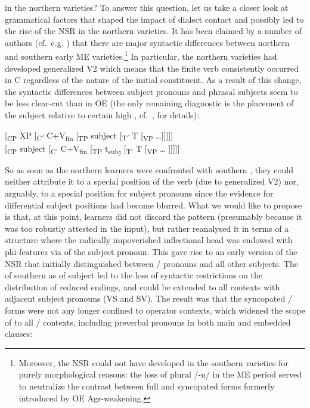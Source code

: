 \documentclass[output=paper]{langsci/langscibook}
\begin{document}
in the northern varieties? To answer this question, let us take a closer look
at grammatical factors that shaped the impact of dialect contact and possibly
led to the rise of the \gls{NSR} in the northern
varieties. It has been claimed by a number of authors (cf.\ e.g.
\citealt{Krochtaylor:1997,Trips:2002}) that there are major syntactic
differences between northern and southern early ME
varieties.\footnote{Moreover, the \gls{NSR} could not
    have developed in the southern varieties for purely morphological reasons:
    the loss of plural /-n/ in the \gls{ME} period served to
    neutralize the contrast between full and syncopated forms formerly
    introduced by \gls{OE} Agr-weakening.} In particular, the northern
    varieties had developed generalized V2 which means that the finite verb
    consistently occurred in C regardless of the nature of the initial
    constituent.  As a result of this change, the syntactic differences between
    subject pronouns and phrasal subjects seem to be less clear-cut than in
    \gls{OE} (the only remaining diagnostic is the placement of the subject
    relative to certain high , cf.\ \citealt{deHaas:2011},
    \citealt{deHaasandvanKemenade:2015} for details):

\ea
\ea \mbox[\textsubscript{CP} XP [\textsubscript{C$'$} C+V\textsubscript{fin} [\textsubscript{TP} subject [\textsubscript{T$'$} T [\textsubscript{VP} \ldots{}]]]]]\\
\ex \mbox[\textsubscript{CP} subject [\textsubscript{C$'$} C+V\textsubscript{fin} [\textsubscript{TP} t\textsubscript{subj} [\textsubscript{T$'$} T [\textsubscript{VP} \ldots{} ]]]]]
\z
\z

So as soon as the northern learners were confronted with southern
, they could neither attribute it to a special position
of the verb (due to generalized V2) nor, arguably, to a special position for
subject pronouns since the evidence for differential subject positions had
become blurred. What we would like to propose is that, at this point, learners
did not discard the pattern (presumably because it was too robustly attested in
the input), but rather reanalysed it in terms of a structure where the
radically impoverished inflectional head was endowed with
phi-features via  of the subject pronoun.
This gave rise to an early version of the \gls{NSR} that initially
distinguished between \Fpl/\Spl{} pronouns and all other subjects. The
 of southern  as 
of subject  led to the loss of syntactic restrictions on the
distribution of reduced endings, and  could be
extended to all contexts with adjacent subject pronouns (VS and SV). The result
was that the syncopated \Fpl/\Spl{} forms were not any longer confined to
operator contexts, which widened the scope of  to all
\Fpl/\Spl{} contexts, including preverbal pronouns in both main and embedded
clauses:
\end{document}
